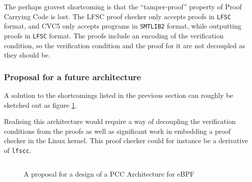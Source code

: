 The perhaps gravest shortcoming is that the ``tamper-proof'' property of Proof Carrying Code is lost.
The LFSC proof checker only accepts proofs in \texttt{LFSC} format, and CVC5 only accepts programs in \texttt{SMTLIB2} format, while outputting proofs in \texttt{LFSC} format. The proofs include an encoding of the verification condition, so the verification condition and the proof for it are not decoupled as they should be.

\subsubsection{Proposal for a future architecture}

A solution to the shortcomings listed in the previous section can roughly be sketched out as figure \ref{fig:pcc-architecture}.

Realising this architecture would require a way of decoupling the verification conditions from the proofs as well as significant work in embedding a proof checker in the Linux kernel. This proof checker could for instance be a derivative of \texttt{lfscc}.






\begin{figure}[htbp!]
  \centering
\inputminted{text}{figures/pcc-architecture.txt}
  \caption{A proposal for a design of a PCC Architecture for eBPF}
  \label{fig:pcc-architecture}
\end{figure}

